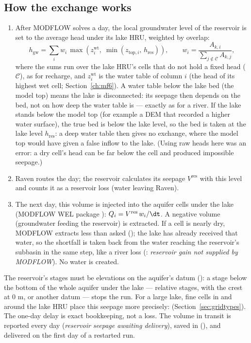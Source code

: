\subsection{How the exchange works}
\begin{enumerate}
\item After MODFLOW solves a day, the local groundwater level of the reservoir is set to the average head under its
lake HRU, weighted by overlap:
\begin{equation}
h_{\mathrm{gw}}=\sum_iw_i\,\max\!\left(z^{\mathrm{wt}}_i,\;\min\!\left(z_{\mathrm{top},i},\,h_{\mathrm{res}}\right)\right),\qquad w_i=\frac{A_{k,i}}{\sum_{j\notin\mathcal{C}}A_{k,j}} ,
\end{equation}
where the sums run over the lake HRU's cells that do not hold a fixed head ($\mathcal{C}$), as for recharge, and
$z^{\mathrm{wt}}_i$ is the water table of column $i$ (the head of its highest wet cell; Section~\ref{ch:mf6}). A water table
below the lake bed (the model top) means the lake is disconnected: its seepage then depends on the bed, not on how deep
the water table is --- exactly as for a river. If the lake stands below the model top (for example a DEM that recorded a
higher water surface), the true bed is below the lake level, so the bed is taken at the lake level $h_{\mathrm{res}}$: a
deep water table then gives no exchange, where the model top would have given a false inflow to the lake. (Using raw heads
here was an error: a dry cell's head can be far below the cell and produced impossible seepage.)
\item Raven routes the day; the reservoir calculates its seepage $V^{\mathrm{res}}$ with this level and counts it as a
reservoir loss (water leaving Raven).
\item The next day, this volume is injected into the aquifer cells under the lake (MODFLOW WEL package
): $Q_i=V^{\mathrm{res}}\,w_i/\dt$. A negative volume (groundwater feeding the reservoir) is extracted.
If a cell is nearly dry, MODFLOW extracts less than asked (); the lake has already received that
water, so the shortfall is taken back from the water reaching the reservoir's subbasin in the same step, like a river loss
(: \emph{reservoir gain not supplied by MODFLOW}). No water is created.
\end{enumerate}
The reservoir's stages must be elevations on the aquifer's datum (): a stage below the
bottom of the whole aquifer under the lake --- relative stages, with the crest at 0 m, or another datum --- stops the run.
For a large lake, fine cells in and around the lake HRU place this seepage more precisely: 
(Section~\ref{sec:gridtypes}). The one-day delay is exact bookkeeping, not a loss. The volume in transit is reported every day (\emph{reservoir seepage
awaiting delivery}), saved in  (), and delivered on the first day of a
restarted run.

